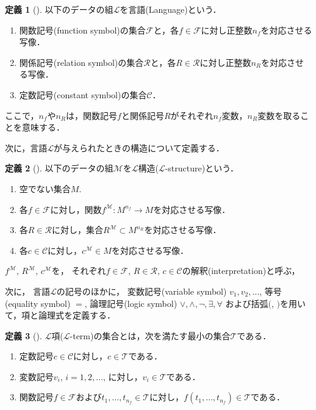 \documentclass[uplatex, dvipdfmx]{jsarticle}
\numberwithin{equation}{section}
\newcommand{\map}[3]{{#1}\colon{#2}\rightarrow{#3}}
\theoremstyle{definition}
\newtheorem{definition}{定義}[section]
\begin{document}
\begin{definition}[{\cite[Definition 1.1.1
     ]{MR1924282}}]
     以下のデータの組$\mathcal{L}$を言語(Language)という．
     \begin{enumerate}
          \item 関数記号(function symbol)の集合$\mathcal{F}$と，各$f \in \mathcal{F}$に対し正整数$n_f$を対応させる写像．
          \item 関係記号(relation symbol)の集合$\mathcal{R}$と，各$R \in \mathcal{R}$に対し正整数$n_R$を対応させる写像．
          \item 定数記号(constant symbol)の集合$\mathcal{C}$．
     \end{enumerate}
\end{definition}

ここで，$n_f$や$n_R$は，関数記号$f$と関係記号$R$がそれぞれ$n_f$変数，$n_R$変数を取ることを意味する．

次に，言語$\mathcal{L}$が与えられたときの構造について定義する．

\begin{definition}[{\cite[Definition 1.1.2]{MR1924282}}]
     以下のデータの組$\mathcal{M}$を$\mathcal{L}$構造($\mathcal{L}$-structure)という．
     \begin{enumerate}
          \item 空でない集合$M$. 
          \item 各$f \in \mathcal{F}$に対し，関数$\map{f^\mathcal{M}}{M^{n_f}}{M}$を対応させる写像．
          \item 各$R \in \mathcal{R}$に対し，集合$R^\mathcal{M} \subset M^{n_R}$を対応させる写像．
          \item 各$c \in \mathcal{C}$に対し，$c^\mathcal{M} \in M$を対応させる写像．
     \end{enumerate}
\end{definition}

$f^\mathcal{M}$, $R^\mathcal{M}$, $c^\mathcal{M}$を，
それぞれ$f \in \mathcal{F}$, $R \in \mathcal{R}$, $c \in \mathcal{C}$の解釈(interpretation)と呼ぶ，

次に，
言語$\mathcal{L}$の記号のほかに，
変数記号(variable symbol) $v_1, v_2, \dots$, 
等号(equality symbol) $=$,
論理記号(logic symbol) $\lor, \land, \lnot, \exists, \forall$
および括弧$($, $)$を用いて，項と論理式を定義する．

\begin{definition}[{\cite[Definition 1.1.4]{MR1924282}}]
     $\mathcal{L}$項($\mathcal{L}$-term)の集合とは，次を満たす最小の集合$\mathcal{T}$である．
     \begin{enumerate}
          \item 定数記号$c \in \mathcal{C}$に対し，$c \in \mathcal{T}$である．
          \item 変数記号$v_i$, $i=1, 2, \dots$, に対し，$v_i \in \mathcal{T}$である．
          \item 関数記号$f \in \mathcal{F}$および$t_1, \dots, t_{n_f} \in \mathcal{T}$に対し，$f(t_1, \dots, t_{n_f}) \in \mathcal{T}$である．
     \end{enumerate}
\end{definition}
\end{document}
